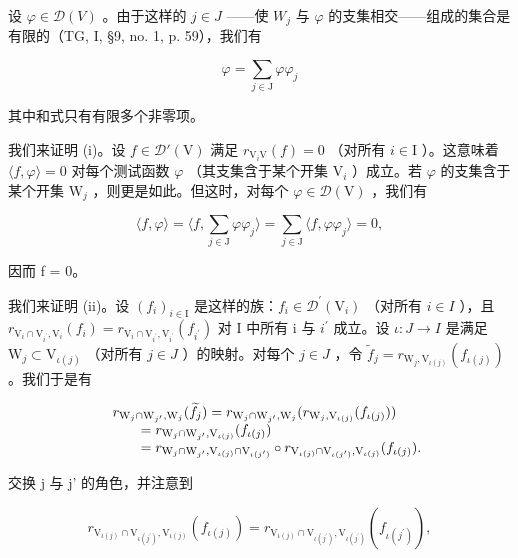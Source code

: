 设 \(\varphi\in\mathcal{D}(V)\) 。由于这样的 \(j\in J\) ——使 \(W_{j}\) 与 \(\varphi\) 的支集相交——组成的集合是有限的（TG, I, §9, no. 1, p. 59），我们有

\[
\varphi = \sum_ {j \in \mathrm{J}} \varphi \varphi_ {j}
\]

其中和式只有有限多个非零项。

我们来证明 (i)。设 \(f \in \mathcal{D}'(\mathrm{V})\) 满足 \(r_{\mathrm{V}_i\mathrm{V}}(f) = 0\) （对所有 \(i \in \mathrm{I}\) ）。这意味着 \(\langle f, \varphi \rangle = 0\) 对每个测试函数 \(\varphi\) （其支集含于某个开集 \(\mathrm{V}_i\) ）成立。若 \(\varphi\) 的支集含于某个开集 \(\mathrm{W}_j\) ，则更是如此。但这时，对每个 \(\varphi \in \mathcal{D}(\mathrm{V})\) ，我们有

\[
\langle f, \varphi \rangle = \langle f, \sum_ {j \in \mathrm{J}} \varphi \varphi_ {j} \rangle = \sum_ {j \in \mathrm{J}} \langle f, \varphi \varphi_ {j} \rangle = 0,
\]

因而 f = 0。

我们来证明 (ii)。设 \((f_{i})_{i\in\mathrm{I}}\) 是这样的族：\(f_{i}\in\mathcal{D}^{\prime}(\mathrm{V}_{i})\) （对所有 \(i\in I\) ），且 \(r_{\mathrm{V}_{i}\cap\mathrm{V}_{i^{\prime}},\mathrm{V}_{i}}(f_{i})=r_{\mathrm{V}_{i}\cap\mathrm{V}_{i^{\prime}},\mathrm{V}_{i^{\prime}}}(f_{i^{\prime}})\) 对 I 中所有 i 与 \(i^{\prime}\) 成立。设 \(\iota:J\to I\) 是满足 \(\mathrm{W}_{j}\subset\mathrm{V}_{\iota(j)}\) （对所有 \(j\in J\) ）的映射。对每个 \(j\in J\) ，令 \(\widetilde{f}_{j}=r_{\mathrm{W}_{j},\mathrm{V}_{\iota(j)}}(f_{\iota(j)})\) 。我们于是有

\[
\begin{array}{r l} & r _ {\mathrm{W} _ {j} \cap \mathrm{W} _ {j ^ {\prime}}, \mathrm{W} _ {j}} (\widetilde {f} _ {j}) = r _ {\mathrm{W} _ {j} \cap \mathrm{W} _ {j ^ {\prime}}, \mathrm{W} _ {j}} (r _ {\mathrm{W} _ {j}, \mathrm{V} _ {\iota (j)}} (f _ {\iota (j)})) \\ & \qquad = r _ {\mathrm{W} _ {j} \cap \mathrm{W} _ {j ^ {\prime}}, \mathrm{V} _ {\iota (j)}} (f _ {\iota (j)}) \\ & \qquad = r _ {\mathrm{W} _ {j} \cap \mathrm{W} _ {j ^ {\prime}}, \mathrm{V} _ {\iota (j)} \cap \mathrm{V} _ {\iota (j ^ {\prime})}} \circ r _ {\mathrm{V} _ {\iota (j)} \cap \mathrm{V} _ {\iota (j ^ {\prime})}, \mathrm{V} _ {\iota (j)}} (f _ {\iota (j)}). \end{array}
\]

交换 j 与 j' 的角色，并注意到

\[
r _ {\mathrm{V} _ {\iota (j)} \cap \mathrm{V} _ {\iota (j ^ {\prime})}, \mathrm{V} _ {\iota (j)}} (f _ {\iota (j)}) = r _ {\mathrm{V} _ {\iota (j)} \cap \mathrm{V} _ {\iota (j ^ {\prime})}, \mathrm{V} _ {\iota (j ^ {\prime})}} (f _ {\iota (j ^ {\prime})}),
\]

